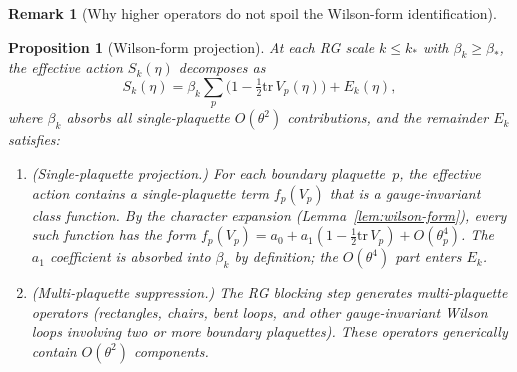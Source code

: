 \documentclass[11pt]{article}
\newtheorem{proposition}[theorem]{Proposition}
\theoremstyle{definition}
\newtheorem{remark}[theorem]{Remark}
\newcommand{\tr}{\mathrm{tr}}
\begin{document}
\begin{remark}[Why higher operators do not spoil the Wilson-form identification]
\begin{proposition}[Wilson-form projection]%
\label{prop:irrelevance}
At each RG scale $k\le k_*$ with $\beta_k\ge\beta_*$, the
effective action $S_k(\eta)$ decomposes as
\begin{equation}
S_k(\eta)=\beta_k\sum_p\bigl(1-\tfrac{1}{2}\tr\,V_p(\eta)\bigr)
+E_k(\eta),
\end{equation}
where $\beta_k$ absorbs all single-plaquette $O(\theta^2)$
contributions, and the remainder $E_k$ satisfies:
\begin{enumerate}[nosep,label=(\roman*)]
\item \emph{(Single-plaquette projection.)}
For each boundary plaquette~$p$, the effective action contains
a single-plaquette term $f_p(V_p)$ that is a gauge-invariant
class function.  By the character expansion
(Lemma~\ref{lem:wilson-form}), every such function has the
form
$f_p(V_p)=a_0+a_1(1-\frac{1}{2}\tr\,V_p)+O(\theta_p^4)$.
The $a_1$ coefficient is absorbed into $\beta_k$ by definition;
the $O(\theta^4)$ part enters $E_k$.
\item \emph{(Multi-plaquette suppression.)}
The RG blocking step generates multi-plaquette operators
(rectangles, chairs, bent loops, and other gauge-invariant
Wilson loops involving two or more boundary plaquettes).
These operators generically contain $O(\theta^2)$ components.


\end{enumerate}
\end{proposition}
\end{remark}
\end{document}
